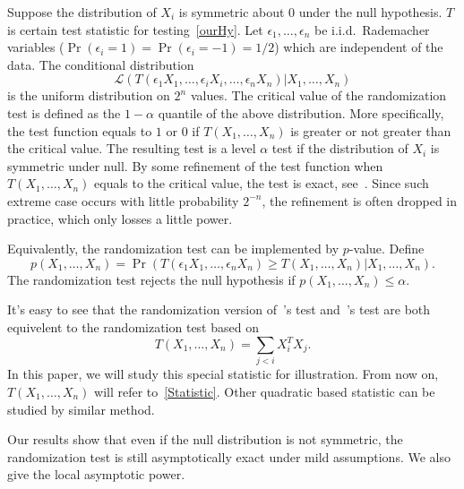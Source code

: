 \documentclass[review]{elsarticle}
\theoremstyle{plain}
\theoremstyle{definition}
\theoremstyle{remark}
\begin{document}
Suppose the distribution of $X_i$ is symmetric about $0$ under the null hypothesis. $T$ is certain test statistic for testing~\eqref{ourHy}.
Let $\epsilon_1,\ldots,\epsilon_n$ be i.i.d.\ Rademacher variables ($\Pr(\epsilon_i=1)=\Pr(\epsilon_i=-1)=1/2$) which are independent of the data.
The conditional distribution
\begin{equation}\label{ranDis}
    \mathcal{L}(T(\epsilon_1 X_1,\ldots,\epsilon_i X_i,\ldots,\epsilon_n X_n)|X_1,\ldots,X_n)
\end{equation}
is the uniform distribution on $2^n$ values.
The critical value of the randomization test is defined as the $1-\alpha$ quantile of the above distribution.
 More specifically, the test function equals to $1$ or $0$ if $T(X_1,\ldots, X_n)$ is greater or not greater than the critical value. The resulting test is a level $\alpha$ test if the distribution of $X_i$ is symmetric under null.
 By some refinement of the test function when $T(X_1,\ldots,X_n)$ equals to the critical value, the test is exact, see~\cite{Romano1990On}.
Since such extreme case occurs with little probability $2^{-n}$, the refinement is often dropped in practice, which only losses  a little power.

Equivalently, the randomization test can be implemented by $p$-value. Define 
\begin{equation*}
    p(X_1,\ldots, X_n)=
    \Pr(T(\epsilon_1 X_1,\ldots,\epsilon_n X_n)\geq T( X_1,\ldots,X_n)|X_1,\ldots,X_n).
\end{equation*}
The randomization test rejects the null hypothesis if $p(X_1,\ldots, X_n)\leq \alpha$. 



 It's easy to see that the randomization version of~\cite{Bai1996Efiect}'s test and~\cite{Chen2010A}'s test are both equivelent to the randomization test based on
\begin{equation}\label{Statistic}
    T(X_1,\ldots,X_n)=\sum_{j<i}X_i^T X_j.
\end{equation}
In this paper, we will study this special statistic for illustration.
From now on, $T(X_1,\ldots,X_n)$ will refer to~\eqref{Statistic}.
Other quadratic based statistic can be studied by similar method.

Our results show that even if the null distribution is not symmetric, the randomization test is still asymptotically exact under mild assumptions. 
We also give the local asymptotic power.



\end{document}
